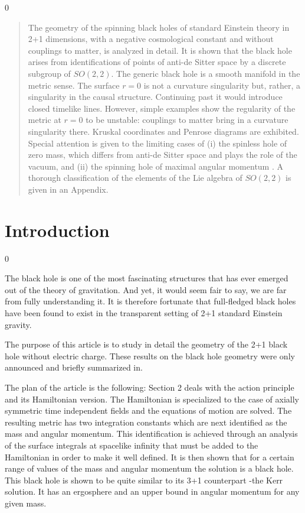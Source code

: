 \setcounter{page} 0
\newpage

\begin{abstract}

The geometry of the spinning black holes of standard Einstein
theory in 2+1 dimensions, with a negative cosmological constant
and without couplings to matter, is analyzed in detail. It is
shown that the black hole arises from identifications of points
of anti-de Sitter space by a discrete subgroup of $SO(2,2)$. The
generic black hole is a smooth manifold in the metric sense. The
surface $r=0$ is not a curvature singularity but, rather, a
singularity in the causal structure.  Continuing past it would
introduce closed timelike lines. However, simple examples show
the regularity of the metric at $r=0$ to be unstable: couplings
to matter bring in a curvature singularity there. Kruskal
coordinates and Penrose diagrams are exhibited. Special
attention is given to the limiting cases of (i) the spinless
hole of zero mass, which differs from anti-de Sitter space and
plays the role of the vacuum, and (ii) the spinning hole of
maximal angular momentum .  A thorough classification of the
elements of the Lie algebra of $SO(2,2)$ is given in an
Appendix.
\smallskip
\bigskip


\end{abstract}

\bigskip
\bigskip
\vfill\break

\newpage
\section{Introduction}
\setcounter{equation} 0

The black hole is one of the most fascinating structures that
has ever emerged out of the theory of gravitation. And yet, it would
seem fair to say, we are far from fully understanding
it. It is therefore fortunate that full-fledged black holes have
been found to exist\cite{1} in the transparent setting of 2+1
standard Einstein gravity\cite{2}.

The purpose of this article is to study in detail the geometry
of the 2+1 black hole without electric charge\cite{3}. These results on the
black
 hole geometry were only announced and briefly summarized in\cite{1}.

The plan of the article is the
following: Section 2 deals with the action principle and its
Hamiltonian version.  The Hamiltonian is specialized to the case
of axially symmetric time independent fields and the equations
of motion are solved. The resulting metric has two integration
constants which are next identified as the mass and angular
momentum. This identification is achieved through an analysis of
the surface integrals at spacelike infinity that must be added
to the Hamiltonian in order to make it well defined. It is then
shown that for a certain range of values of the mass and angular
momentum the solution is a black hole. This black hole is shown
to be quite similar to its 3+1 counterpart -the Kerr solution.
It has an ergosphere and an upper bound in angular momentum for
any given mass.

